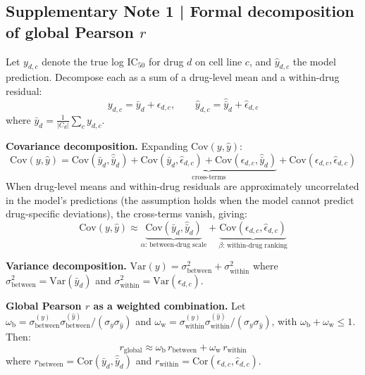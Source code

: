 \subsection*{Supplementary Note 1 | Formal decomposition of global Pearson $r$}

Let $y_{d,c}$ denote the true log IC$_{50}$ for drug $d$ on cell line $c$, and $\hat{y}_{d,c}$ the model prediction.
Decompose each as a sum of a drug-level mean and a within-drug residual:
\begin{equation}
y_{d,c} = \bar{y}_d + \epsilon_{d,c}, \qquad
\hat{y}_{d,c} = \hat{\bar{y}}_d + \hat{\epsilon}_{d,c}
\label{eq:decomp}
\end{equation}
where $\bar{y}_d = \frac{1}{|C_d|}\sum_c y_{d,c}$.

\textbf{Covariance decomposition.}
Expanding $\mathrm{Cov}(y,\hat{y})$:
\begin{equation}
\mathrm{Cov}(y,\hat{y})
= \mathrm{Cov}(\bar{y}_d,\hat{\bar{y}}_d)
+ \underbrace{\mathrm{Cov}(\bar{y}_d,\hat{\epsilon}_{d,c}) + \mathrm{Cov}(\epsilon_{d,c},\hat{\bar{y}}_d)}_{\text{cross-terms}}
+ \mathrm{Cov}(\epsilon_{d,c},\hat{\epsilon}_{d,c})
\end{equation}
When drug-level means and within-drug residuals are approximately uncorrelated in the model's predictions (the assumption holds when the model cannot predict drug-specific deviations), the cross-terms vanish, giving:
\begin{equation}
\mathrm{Cov}(y,\hat{y})
\approx \underbrace{\mathrm{Cov}(\bar{y}_d,\hat{\bar{y}}_d)}_{\alpha:\,\text{between-drug scale}}
+ \underbrace{\mathrm{Cov}(\epsilon_{d,c},\hat{\epsilon}_{d,c})}_{\beta:\,\text{within-drug ranking}}
\label{eq:cov_decomp}
\end{equation}

\textbf{Variance decomposition.}
$\mathrm{Var}(y) = \sigma^2_{\mathrm{between}} + \sigma^2_{\mathrm{within}}$ where $\sigma^2_{\mathrm{between}} = \mathrm{Var}(\bar{y}_d)$ and $\sigma^2_{\mathrm{within}} = \mathrm{Var}(\epsilon_{d,c})$.

\textbf{Global Pearson $r$ as a weighted combination.}
Let $\omega_{\mathrm{b}} = \sigma^{(y)}_{\mathrm{between}} \sigma^{(\hat{y})}_{\mathrm{between}} / (\sigma_y \sigma_{\hat{y}})$ and $\omega_{\mathrm{w}} = \sigma^{(y)}_{\mathrm{within}} \sigma^{(\hat{y})}_{\mathrm{within}} / (\sigma_y \sigma_{\hat{y}})$, with $\omega_{\mathrm{b}} + \omega_{\mathrm{w}} \leq 1$.
Then:
\begin{equation}
r_{\mathrm{global}}
\approx \omega_{\mathrm{b}}\,r_{\mathrm{between}} + \omega_{\mathrm{w}}\,r_{\mathrm{within}}
\label{eq:global_r}
\end{equation}
where $r_{\mathrm{between}} = \mathrm{Cor}(\bar{y}_d,\hat{\bar{y}}_d)$ and $r_{\mathrm{within}} = \mathrm{Cor}(\epsilon_{d,c},\hat{\epsilon}_{d,c})$.

